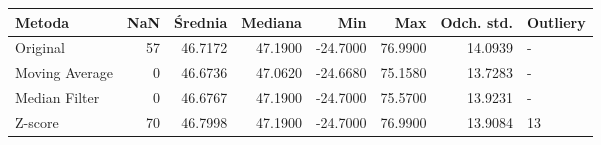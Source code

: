 \documentclass[12pt,twoside]{article}
\begin{document}
	\begin{table}
    \centering
    \begin{tabular}{|l|r|r|r|r|r|r|l|}
        \toprule
        \textbf{Metoda} & \textbf{NaN} & \textbf{Średnia} & \textbf{Mediana} & \textbf{Min} & \textbf{Max} & \textbf{Odch. std.} & \textbf{Outliery} \\
        \midrule

				Original


			 &
				57


			 &
				46.7172


			 &
				47.1900


			 &
				-24.7000


			 &
				76.9900


			 &
				14.0939


			 &
				-


			 \\

				Moving
				Average


			 &
				0


			 &
				46.6736


			 &
				47.0620


			 &
				-24.6680


			 &
				75.1580


			 &
				13.7283


			 &
				-


			 \\

				Median
				Filter


			 &
				0


			 &
				46.6767


			 &
				47.1900


			 &
				-24.7000


			 &
				75.5700


			 &
				13.9231


			 &
				-


			 \\

				Z-score


			 &
				70


			 &
				46.7998


			 &
				47.1900


			 &
				-24.7000


			 &
				76.9900


			 &
				13.9084


			 &
				13


			 \\


\end{tabular}
\end{table}
\end{document}
